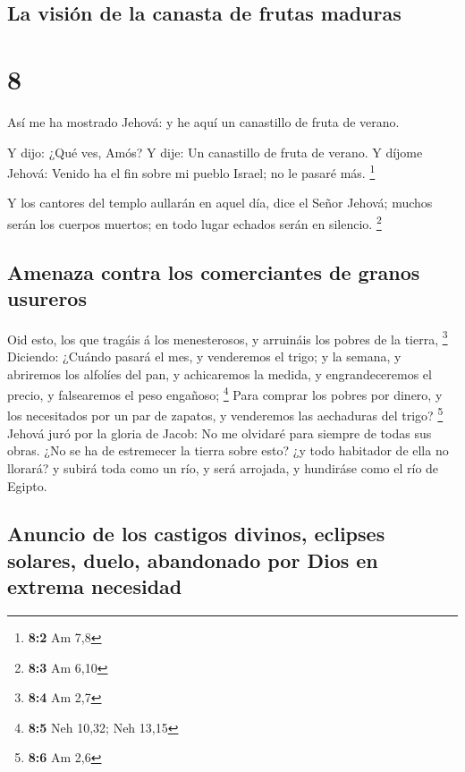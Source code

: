 \hypertarget{la-visiuxf3n-de-la-canasta-de-frutas-maduras}{%
\subsection{La visión de la canasta de frutas
maduras}\label{la-visiuxf3n-de-la-canasta-de-frutas-maduras}}

\hypertarget{section-7}{%
\section{8}\label{section-7}}

 Así me ha mostrado Jehová: y he aquí un canastillo de
fruta de verano.

 Y dijo: ¿Qué ves, Amós? Y dije: Un canastillo de fruta de
verano. Y díjome Jehová: Venido ha el fin sobre mi pueblo Israel; no le
pasaré más. \footnote{\textbf{8:2} Am 7,8}

 Y los cantores del templo aullarán en aquel día, dice el
Señor Jehová; muchos serán los cuerpos muertos; en todo lugar echados
serán en silencio. \footnote{\textbf{8:3} Am 6,10}

\hypertarget{amenaza-contra-los-comerciantes-de-granos-usureros}{%
\subsection{Amenaza contra los comerciantes de granos
usureros}\label{amenaza-contra-los-comerciantes-de-granos-usureros}}

 Oid esto, los que tragáis á los menesterosos, y arruináis
los pobres de la tierra, \footnote{\textbf{8:4} Am 2,7} 
Diciendo: ¿Cuándo pasará el mes, y venderemos el trigo; y la semana, y
abriremos los alfolíes del pan, y achicaremos la medida, y
engrandeceremos el precio, y falsearemos el peso engañoso; \footnote{\textbf{8:5}
  Neh 10,32; Neh 13,15}  Para comprar los pobres por
dinero, y los necesitados por un par de zapatos, y venderemos las
aechaduras del trigo? \footnote{\textbf{8:6} Am 2,6} 
Jehová juró por la gloria de Jacob: No me olvidaré para siempre de todas
sus obras.  ¿No se ha de estremecer la tierra sobre esto?
¿y todo habitador de ella no llorará? y subirá toda como un río, y será
arrojada, y hundiráse como el río de Egipto.

\hypertarget{anuncio-de-los-castigos-divinos-eclipses-solares-duelo-abandonado-por-dios-en-extrema-necesidad}{%
\subsection{Anuncio de los castigos divinos, eclipses solares, duelo,
abandonado por Dios en extrema
necesidad}\label{anuncio-de-los-castigos-divinos-eclipses-solares-duelo-abandonado-por-dios-en-extrema-necesidad}}

